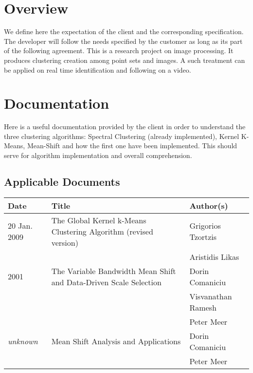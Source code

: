 \section{Overview}
We define here the expectation of the client and the corresponding specification. The developer will follow the needs specified by the customer as long as its part of the following agreement. This is a research project on image processing. It produces clustering creation among point sets and images.
A such treatment can be applied on real time identification and following on a video.
\section{Documentation}
Here is a useful documentation provided by the client in order to understand the three clustering algorithms: Spectral Clustering (already implemented), Kernel K-Means, Mean-Shift and how the first one have been implemented. This should serve for algorithm implementation and overall comprehension.
\subsection{Applicable Documents}
\begin{center}
    \begin{tabular}{ | p{} | l | p{} |}
    \hline
    \textbf{Date} & \textbf{Title} & \textbf{Author(s)}
    \\
    \hline
    20 Jan. 2009 & The Global Kernel k-Means Clustering Algorithm (revised version) & Grigorios Tzortzis
    \\ & & Aristidis Likas
    \\ 
    \hline
    2001 & The Variable Bandwidth Mean Shift and Data-Driven Scale Selection & Dorin Comaniciu
    \\ & & Visvanathan Ramesh
    \\ & & Peter Meer
    \\ 
    \hline
    \textit{unknown}& Mean Shift Analysis and Applications & Dorin Comaniciu
    \\ & & Peter Meer
    \\
    \hline
    \end{tabular}
\end{center}
